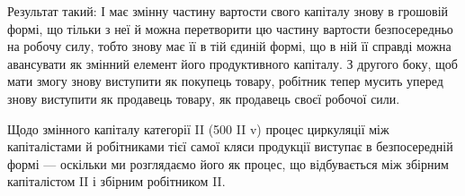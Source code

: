 Результат такий: І має змінну частину вартости свого капіталу знову
в грошовій формі, що тільки з неї й можна перетворити цю частину
вартости безпосередньо на робочу силу, тобто знову має її в тій єдиній
формі, що в ній її справді можна авансувати як змінний елемент його
продуктивного капіталу. З другого боку, щоб мати змогу знову виступити
як покупець товару, робітник тепер мусить уперед знову виступити
як продавець товару, як продавець своєї робочої сили.

Щодо змінного капіталу категорії II (500 II v) процес циркуляції
між капіталістами й робітниками тієї самої кляси продукції виступає в
безпосередній формі — оскільки ми розглядаємо його як процес, що відбувається
між збірним капіталістом II і збірним робітником II.
